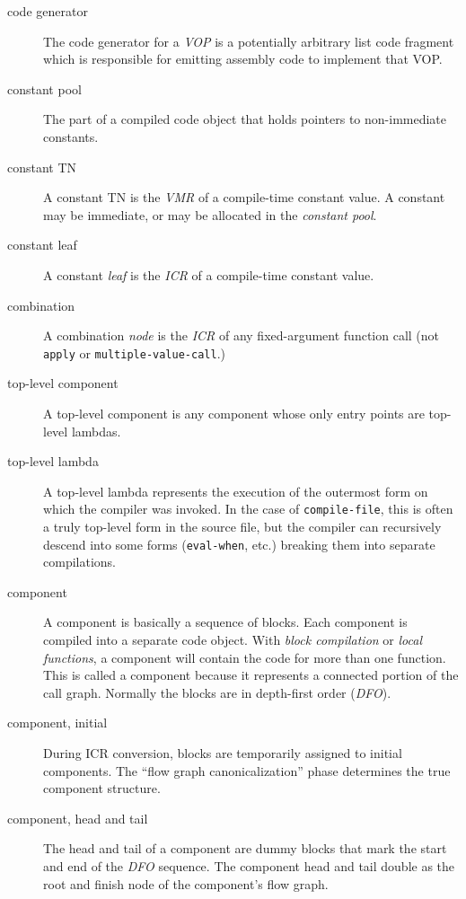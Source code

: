 \begin{description}
\item[code generator] The code generator for a {\it VOP} is a potentially
arbitrary list code fragment which is responsible for emitting assembly code to
implement that VOP.

\item[constant pool] The part of a compiled code object that holds pointers to
non-immediate constants.

\item[constant TN]
A constant TN is the {\it VMR} of a compile-time constant value.  A
constant may be immediate, or may be allocated in the {\it constant pool}.

\item[constant leaf]
A constant {\it leaf} is the {\it ICR} of a compile-time constant value.

\item[combination]
A combination {\it node} is the {\it ICR} of any fixed-argument function
call (not {\tt apply} or {\tt multiple-value-call}.)  

\item[top-level component]
A top-level component is any component whose only entry points are top-level
lambdas.

\item[top-level lambda]
A top-level lambda represents the execution of the outermost form on which
the compiler was invoked.  In the case of {\tt compile-file}, this is often a
truly top-level form in the source file, but the compiler can recursively
descend into some forms ({\tt eval-when}, etc.) breaking them into separate
compilations.

\item[component] A component is basically a sequence of blocks.  Each component
is compiled into a separate code object.  With {\it block compilation} or {\it
local functions}, a component will contain the code for more than one function.
This is called a component because it represents a connected portion of the
call graph.  Normally the blocks are in depth-first order ({\it DFO}).

\item[component, initial] During ICR conversion, blocks are temporarily
assigned to initial components.  The ``flow graph canonicalization'' phase
determines the true component structure.

\item[component, head and tail]
The head and tail of a component are dummy blocks that mark the start and
end of the {\it DFO} sequence.  The component head and tail double as the root
and finish node of the component's flow graph.


\end{description}
